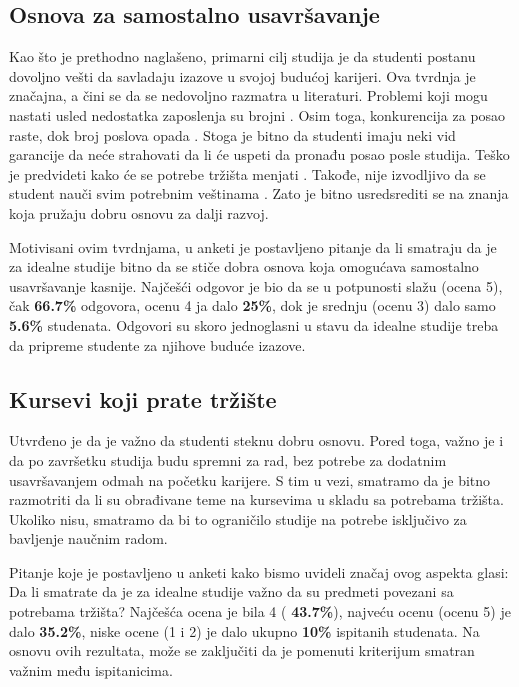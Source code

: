 \documentclass[a4paper]{article}
\begin{document}
\subsection{Osnova za samostalno usavršavanje}
\label{subsec:usavršavanje_stavovi}
Kao što je prethodno naglašeno, primarni cilj studija je da studenti postanu dovoljno vešti da savladaju izazove u svojoj budućoj karijeri. Ova tvrdnja je značajna, a čini se da se nedovoljno razmatra u literaturi. Problemi koji mogu nastati usled nedostatka zaposlenja su brojni \cite{job_lacking}. Osim toga, konkurencija za posao raste, dok broj poslova opada \cite{job_competition}. Stoga je bitno da studenti imaju neki vid garancije da neće strahovati da li će uspeti da pronađu posao posle studija.
Teško je predvideti kako će se potrebe tržišta menjati \cite{job_prediction}. Takođe, nije izvodljivo da se student nauči svim potrebnim veštinama \cite{learn_everything}. Zato je bitno usredsrediti se na znanja koja pružaju dobru osnovu za dalji razvoj.

Motivisani ovim tvrdnjama, u anketi je postavljeno pitanje da li smatraju da je za idealne studije bitno da se stiče dobra osnova koja omogućava samostalno usavršavanje kasnije. Najčešći odgovor je bio da se u potpunosti slažu (ocena 5), čak \textbf{66.7\%} odgovora, ocenu 4 ja dalo \textbf{25\%}, dok je srednju (ocenu 3) dalo samo \textbf{5.6\%} studenata. Odgovori su skoro jednoglasni u stavu da idealne studije treba da pripreme studente za njihove buduće izazove. 

\subsection{Kursevi koji prate tržište}
\label{subsec:tržište_stavovi}
Utvrđeno je da je važno da studenti steknu dobru osnovu. Pored toga, važno je i da po završetku studija budu spremni za rad, bez potrebe za dodatnim usavršavanjem odmah na početku karijere.
S tim u vezi, smatramo da je bitno razmotriti da li su obrađivane teme na kursevima u skladu sa potrebama tržišta. Ukoliko nisu, smatramo da bi to ograničilo studije na potrebe isključivo za bavljenje naučnim radom.

Pitanje koje je postavljeno u anketi kako bismo uvideli značaj ovog aspekta glasi: Da li smatrate da je za idealne studije važno da su predmeti povezani sa potrebama tržišta? Najčešća ocena je bila 4 ( \textbf{43.7\%}), najveću ocenu (ocenu 5) je dalo \textbf{35.2\%}, niske ocene (1 i 2) je dalo ukupno \textbf{10\%} ispitanih studenata. Na osnovu ovih rezultata, može se zaključiti da je pomenuti kriterijum smatran važnim među ispitanicima.
\end{document}
